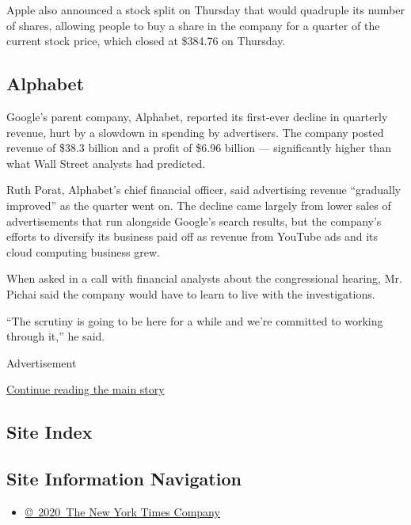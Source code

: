 Apple also announced a stock split on Thursday that would quadruple its
number of shares, allowing people to buy a share in the company for a
quarter of the current stock price, which closed at \$384.76 on
Thursday.

\hypertarget{alphabet}{%
\subsection{Alphabet}\label{alphabet}}

Google's parent company, Alphabet, reported its first-ever decline in
quarterly revenue, hurt by a slowdown in spending by advertisers. The
company posted revenue of \$38.3 billion and a profit of \$6.96 billion
--- significantly higher than what Wall Street analysts had predicted.

Ruth Porat, Alphabet's chief financial officer, said advertising revenue
``gradually improved'' as the quarter went on. The decline came largely
from lower sales of advertisements that run alongside Google's search
results, but the company's efforts to diversify its business paid off as
revenue from YouTube ads and its cloud computing business grew.

When asked in a call with financial analysts about the congressional
hearing, Mr. Pichai said the company would have to learn to live with
the investigations.

``The scrutiny is going to be here for a while and we're committed to
working through it,'' he said.

Advertisement

\protect\hyperlink{after-bottom}{Continue reading the main story}

\hypertarget{site-index}{%
\subsection{Site Index}\label{site-index}}

\hypertarget{site-information-navigation}{%
\subsection{Site Information
Navigation}\label{site-information-navigation}}

\begin{itemize}
\tightlist
\item
  \href{https://help.nytimes.com/hc/en-us/articles/115014792127-Copyright-notice}{©~2020~The
  New York Times Company}
\end{itemize}

